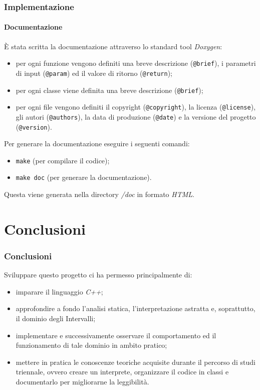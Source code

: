 \documentclass{beamer}
\begin{document}
	\begin{frame}[fragile]
		\frametitle{Implementazione}
		\framesubtitle{Documentazione}
		È stata scritta la \alert{documentazione} attraverso lo standard tool \textit{Doxygen}:
		\begin{itemize}
			\item per ogni \alert{funzione} vengono definiti una breve descrizione (\verb|@brief|), i parametri di input (\verb|@param|) ed il valore di ritorno (\verb|@return|);
			\item per ogni \alert{classe} viene definita una breve descrizione (\verb|@brief|);
			\item per ogni \alert{file} vengono definiti il copyright (\verb|@copyright|), la licenza (\verb|@license|), gli autori (\verb|@authors|), la data di produzione (\verb|@date|) e la versione del progetto (\verb|@version|).
		\end{itemize}

		\medskip
		Per generare la documentazione eseguire i seguenti comandi:
		\begin{itemize}
			\item \verb|make| (per compilare il codice);
			\item \verb|make doc| (per generare la documentazione).
		\end{itemize}
		Questa viene generata nella directory \textit{/doc} in formato \textit{HTML}.

\end{frame}





\section{Conclusioni}
	\begin{frame}
		\frametitle{Conclusioni}
		Sviluppare questo progetto ci ha permesso principalmente di:
		\begin{itemize}
			\item imparare il linguaggio \textit{C++};
			\item approfondire a fondo l'analisi statica, l'interpretazione astratta e, soprattutto, il dominio degli Intervalli;
			\item implementare e successivamente osservare il comportamento ed il funzionamento di tale dominio in ambito pratico;
			\item mettere in pratica le conoscenze teoriche acquisite durante il percorso di studi triennale, ovvero creare un interprete, organizzare il codice in classi e documentarlo per migliorarne la leggibilità.
		\end{itemize}


\end{frame}
\end{document}
